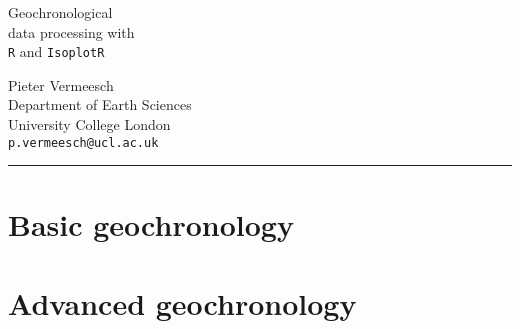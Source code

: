 \documentclass[11pt,openany]{book}
\begin{document}
\begin{titlepage}
  
  \parbox[t]{0.93\textwidth}{
    \parbox[t]{0.91\textwidth}{
      \raggedleft
      \fontsize{50pt}{80pt}
      \vspace{0.7cm}
      \Huge
      Geochronological\\
      data processing with\\
      \texttt{R} and \texttt{IsoplotR} \\
    }
  }

\vfill
  
  \parbox[t]{0.93\textwidth}{
    \raggedleft
    \large
        {\Large Pieter Vermeesch}\\[4pt]
        Department of Earth Sciences\\
        University College London\\[4pt]
        \texttt{p.vermeesch@ucl.ac.uk}\\
	
        \hfill\rule{0.2\linewidth}{1pt}
}
	
\end{titlepage}

\tableofcontents

\part{Basic geochronology}

































\part{Advanced geochronology}
\end{document}
